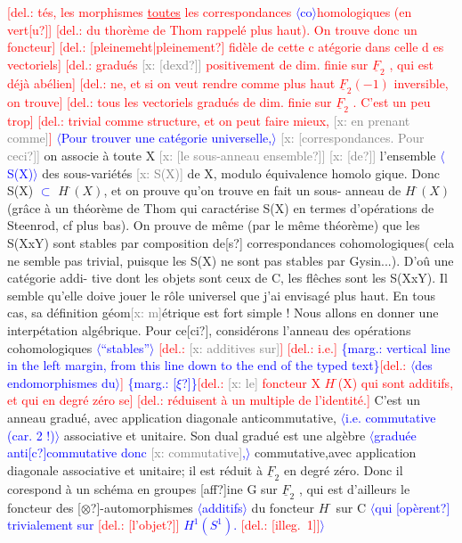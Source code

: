 \documentclass[11pt]{article}
\newcommand{\scanpage}[1]{\par\bigskip\noindent{\small\sffamily[scan #1]}\par}
\newcommand{\mspage}[1]{{\small\sffamily[p.\,#1]}}
\newcommand{\hand}[1]{\textcolor{blue}{#1}}
\newcommand{\inserted}[2][]{\textcolor{blue}{$\langle$#2$\rangle$}}
\newcommand{\margin}[1]{\textcolor{blue}{\{\textsf{marg.:} #1\}}}
\newcommand{\deleted}[1]{\textcolor{red}{[\textsf{del.:} #1]}}
\newcommand{\xout}[1]{\textcolor{gray}{[\textsf{x:} #1]}}
\newcommand{\uline}[1]{\underline{#1}}
\newcommand{\unsure}[1]{[#1?]}
\newcommand{\illegible}[1]{[\textsf{illeg.\ #1}]}
\begin{document}
\mspage{46}

\clearpage
\scanpage{162-5/47}
\deleted{tés, les morphismes \uline{toutes} les correspondances \inserted[typed]{co}homologiques (en vert\unsure{u}}
\deleted{du thorème de Thom rappelé plus haut). On trouve donc un foncteur}
\deleted{\unsure{pleinemeht|pleinement} fidèle de cette c atégorie dans celle d es vectoriels}
\deleted{gradués \xout{\unsure{dexd}} positivement de dim. finie sur $\underline{F}_2$ , qui est déjà abélien}
\deleted{ne, et si on veut rendre comme plus haut $\underline{F}_2(-1)$ inversible, on trouve}
\deleted{tous les vectoriels gradués de dim. finie sur $\underline{F}_2$ . C'est un peu trop}
\deleted{trivial comme structure, et on peut faire mieux, \xout{en prenant comme}}
\inserted[typed]{Pour trouver une catégorie universelle,}
\xout{\unsure{correspondances. Pour ceci}} on associe à toute X \xout{\unsure{le sous-anneau ensemble}}
\xout{\unsure{de}} l'ensemble \inserted[typed]{S(X)} des sous-variétés \xout{S(X)} de X, modulo équivalence homolo%
gique. Donc S(X) \hand{$\subset$} $H^{\cdot}(X)$, et on prouve qu'on trouve en fait un sous-%
anneau de $H^{\cdot}(X)$ (grâce à un théorème de Thom qui caractérise S(X) en
termes d'opérations de Steenrod, cf plus bas). On prouve de même
(par le même théorème) que les S(XxY) sont stables par composition de\unsure{s}
correspondances cohomologiques( cela ne semble pas trivial, puisque
les S(X) ne sont pas stables par Gysin...). D'oû une catégorie addi-%
tive dont les objets sont ceux de C, les flêches sont les S(XxY).
Il semble qu'elle doive jouer le rôle universel que j'ai envisagé
plus haut. En tous cas, sa définition géom\xout{m}étrique est fort simple !
Nous allons en donner une interpétation algébrique. Pour ce\unsure{ci},
considérons l'anneau des opérations cohomologiques \inserted[typed]{``stables''} \deleted{\xout{additives sur}} \deleted{i.e.}
\margin{vertical line in the left margin, from this line down to the end of the typed text}\deleted{\inserted[typed]{des endomorphismes du}}
\margin{\unsure{$\xi$}}\deleted{\xout{le} foncteur X \quad $H^{\cdot}$(X) qui sont additifs, et qui en degré zéro se}
\deleted{réduisent à un multiple de l'identité.} C'est un anneau gradué, avec
application diagonale anticommutative, \inserted[typed]{i.e. commutative (car. 2 !)} associative et unitaire. Son
dual gradué est une algèbre \inserted[typed]{graduée anti\unsure{c}commutative donc \xout{commutative},} commutative,avec application diagonale
associative et unitaire; il est réduit à $\underline{F}_2$ en degré zéro. Donc il
corespond à un schéma en groupes \unsure{aff}ine G sur $\underline{F}_2$ , qui est d'ailleurs
le foncteur des \unsure{$\otimes$}-automorphismes \inserted[typed]{additifs} du foncteur $H^{\cdot}$ sur C \inserted{qui \unsure{opèrent}
trivialement sur \deleted{\unsure{l'objet}} $H^1(S^1)$. \deleted{\illegible{1}}}
\end{document}
